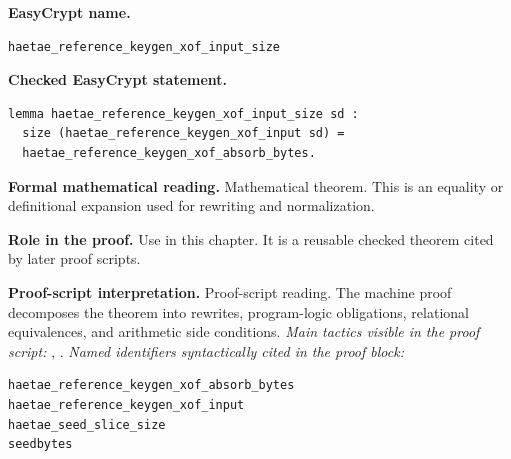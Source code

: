 \begin{formaltheorem}
\noindent\textbf{EasyCrypt name.}
\begin{lstlisting}[language=EasyCrypt,basicstyle=\ttfamily\scriptsize]
haetae_reference_keygen_xof_input_size
\end{lstlisting}
\noindent\textbf{Checked EasyCrypt statement.}
\begin{lstlisting}[language=EasyCrypt,basicstyle=\ttfamily\scriptsize]
lemma haetae_reference_keygen_xof_input_size sd :
  size (haetae_reference_keygen_xof_input sd) =
  haetae_reference_keygen_xof_absorb_bytes.
\end{lstlisting}
\noindent\textbf{Formal mathematical reading.}
Mathematical theorem. This is an equality or definitional expansion used for rewriting and normalization.

\noindent\textbf{Role in the proof.}
Use in this chapter. It is a reusable checked theorem cited by later proof scripts.

\noindent\textbf{Proof-script interpretation.}
Proof-script reading. The machine proof decomposes the theorem into rewrites, program-logic obligations, relational equivalences, and arithmetic side conditions.
\emph{Main tactics visible in the proof script:} , .
\emph{Named identifiers syntactically cited in the proof block:}
\begin{lstlisting}[language=EasyCrypt,basicstyle=\ttfamily\scriptsize]
haetae_reference_keygen_xof_absorb_bytes
haetae_reference_keygen_xof_input
haetae_seed_slice_size
seedbytes
\end{lstlisting}

\end{formaltheorem}

